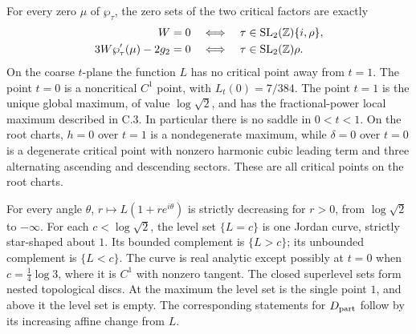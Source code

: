 \begin{statement}
For every zero $\mu$ of $\wp_\tau$, the zero sets of the two
critical factors are exactly
\[
 \begin{aligned}
 W=0&\quad\Longleftrightarrow\quad
       \tau\in\operatorname{SL}_2(\mathbb Z)\{i,\rho\},\\
 3W\wp'_\tau(\mu)-2g_2=0&\quad\Longleftrightarrow\quad
       \tau\in\operatorname{SL}_2(\mathbb Z)\rho.
 \end{aligned}
\]
On the coarse $t$-plane the function $L$ has no critical point
away from $t=1$. The point $t=0$ is a noncritical $C^1$ point,
with $L_t(0)=7/384$. The point $t=1$ is the unique global
maximum, of value $\log\sqrt2$, and has the fractional-power
local maximum described in C.3. In particular there is no
saddle in $0<t<1$. On the root charts, $h=0$ over $t=1$
is a nondegenerate maximum, while $\delta=0$ over $t=0$
is a degenerate critical point with nonzero harmonic cubic
leading term and three alternating ascending and descending
sectors. These are all critical points on the root charts.

For every angle $\theta$, $r\mapsto L(1+re^{i\theta})$ is
strictly decreasing for $r>0$, from $\log\sqrt2$ to $-\infty$.
For each $c<\log\sqrt2$, the level set $\{L=c\}$ is one
Jordan curve, strictly star-shaped about $1$. Its bounded
complement is $\{L>c\}$; its unbounded complement is
$\{L<c\}$. The curve is real analytic except possibly at
$t=0$ when $c=\frac14\log3$, where it is $C^1$ with nonzero
tangent. The closed superlevel sets form nested topological
discs. At the maximum the level set is the single point $1$,
and above it the level set is empty. The corresponding
statements for $D_{\rm part}$ follow by its increasing affine
change from $L$.
\end{statement}
